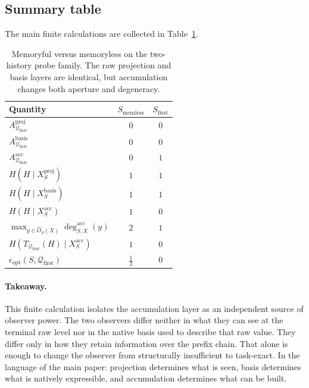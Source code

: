 \documentclass[11pt,twoside]{article}
\newcommand{\TableHeaderRow}{\rowcolor{tableheaderbg}\bfseries}
\theoremstyle{definition}
\newcommand{\proj}{\mathrm{proj}}
\newcommand{\basis}{\mathrm{basis}}
\newcommand{\acc}{\mathrm{acc}}
\begin{document}
\subsection{Summary table}
\label{app:memory-summary}

The main finite calculations are collected in Table~\ref{tab:memory-summary}.

\begin{table}[t]
\centering
\begin{tabular}{lcc}
\toprule
\TableHeaderRow
Quantity & \(S_{\mathrm{memless}}\) & \(S_{\mathrm{first}}\) \\
\midrule
\(A^{\proj}_{\mathcal{Q}_{\mathrm{first}}}\) & \(0\) & \(0\) \\
\(A^{\basis}_{\mathcal{Q}_{\mathrm{first}}}\) & \(0\) & \(0\) \\
\(A^{\acc}_{\mathcal{Q}_{\mathrm{first}}}\) & \(0\) & \(1\) \\
\(H(H\mid X_S^{\proj})\) & \(1\) & \(1\) \\
\(H(H\mid X_S^{\basis})\) & \(1\) & \(1\) \\
\(H(H\mid X_S^{\acc})\) & \(1\) & \(0\) \\
\(\max_{y\in \widehat{O}_S(X)} \deg^{\acc}_{S,X}(y)\) & \(2\) & \(1\) \\
\(H(T_{\mathcal{Q}_{\mathrm{first}}}(H)\mid X_S^{\acc})\) & \(1\) & \(0\) \\
\(\epsilon_{\mathrm{opt}}(S,\mathcal{Q}_{\mathrm{first}})\)
& \(\frac12\) & \(0\) \\
\bottomrule
\end{tabular}
\caption{Memoryful versus memoryless on the two-history probe family. The raw projection and basis layers are identical, but accumulation changes both aperture and degeneracy.}
\label{tab:memory-summary}
\end{table}

\paragraph{Takeaway.}
This finite calculation isolates the accumulation layer as an independent source of observer power. The two observers differ neither in what they can see at the terminal raw level nor in the native basis used to describe that raw value. They differ only in how they retain information over the prefix chain. That alone is enough to change the observer from structurally insufficient to task-exact. In the language of the main paper: projection determines what is seen, basis determines what is natively expressible, and accumulation determines what can be built.
\end{document}
